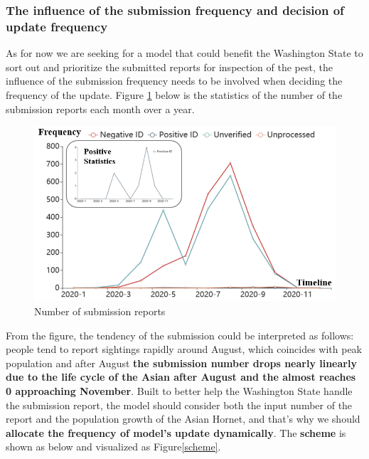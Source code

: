 \documentclass{mcmthesis}
\begin{document}
 	\subsubsection{The influence of the submission frequency and decision of update frequency}
 	\quad As for now we are seeking for a model that could benefit the Washington State to sort out and prioritize the submitted reports for inspection of the pest, the influence of the submission frequency needs to be involved when deciding the frequency of the update. Figure \ref{f} below is the statistics of the number of the submission reports each month over a year.
 	\begin{figure}[h]
 		\centering
 		\includegraphics[scale=0.7]{f2.png}
 		\caption{Number of submission reports}
 		\label{f}
 	\end{figure}
 	From the figure, the tendency of the submission could be interpreted as follows: people tend to report sightings rapidly around August, which coincides with peak population and after August \textbf{the submission number drops nearly linearly due to the life cycle of the Asian after August and the almost reaches 0 approaching November}. Built to better help the Washington State handle the submission report, the model should consider both the input number of the report and the population growth of the Asian Hornet, and that's why we should \textbf{allocate the frequency of model's update dynamically}. The \textbf{scheme} is shown as below and visualized as Figure\ref{scheme}.
\end{document}
